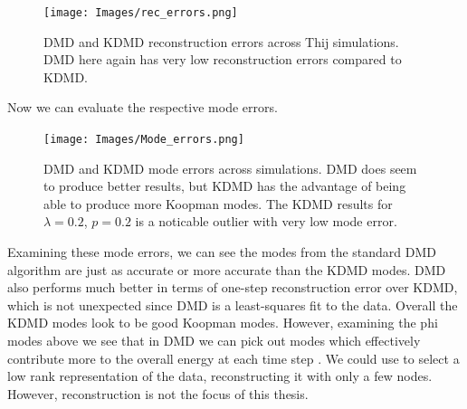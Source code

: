 
\begin{figure}
    \texttt{[image: Images/rec\_errors.png]}
    \centering
    \caption{DMD and KDMD reconstruction errors across Thij simulations. DMD here again
    has very low reconstruction errors compared to KDMD.}
\end{figure}

Now we can evaluate the respective mode errors.

\begin{figure}
    \texttt{[image: Images/Mode\_errors.png]}
    \centering
    \caption{DMD and KDMD mode errors across simulations. DMD does seem to produce 
    better results, but KDMD has the advantage of being able to produce more Koopman modes. The
    KDMD results for $\lambda=0.2$, $p=0.2$ is a noticable outlier with very low mode error.}
\end{figure}

\FloatBarrier

Examining these mode errors, we can see the modes
from the standard DMD algorithm are just as accurate or more 
 accurate than the KDMD modes. DMD also performs much better in terms of one-step
reconstruction error over KDMD, which is not unexpected since 
DMD is a least-squares fit to the data. Overall the KDMD modes look to 
be good Koopman modes. However, examining the phi modes above we see that in 
DMD we can pick out modes which effectively contribute more to the overall energy 
at each time step \cite{chris}. We could use to select a low rank representation
of the data, reconstructing it with only a few nodes. However, reconstruction is not the focus 
of this thesis.


